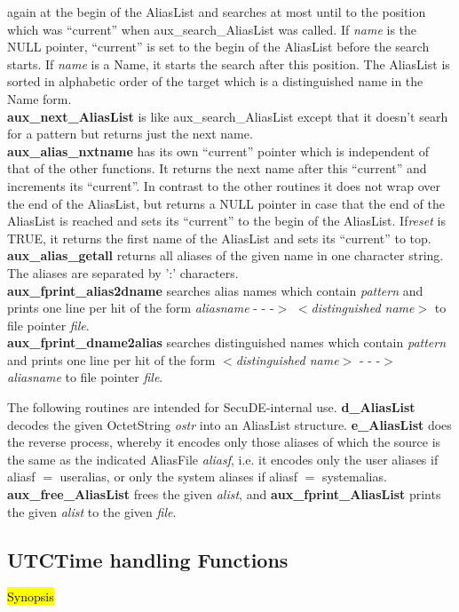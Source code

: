 again at the begin of the AliasList and searches at most until to the position
which was ``current'' when aux\_search\_AliasList was called. If {\em name} is the 
NULL pointer, ``current'' is set to the begin of the AliasList before the search starts.
If {\em name} is a Name, it starts the search after this position. The AliasList
is sorted in alphabetic order of the target which is a distinguished name in the Name form.
\\ [1em]
{\bf aux\_next\_AliasList} is like aux\_search\_AliasList except that it doesn't searh
for a pattern but returns just the next name. 
\\ [1em]
{\bf aux\_alias\_nxtname} has its own ``current'' pointer which is independent of that
of the other functions. It returns the next name after this ``current'' and increments
its ``current''. In contrast to the other routines it does not wrap over the end of
the AliasList, but returns a NULL pointer in case that the end of the AliasList
is reached and sets its ``current'' to the begin of the AliasList. If{\em reset} is TRUE,
it returns the first name of the AliasList and sets its ``current'' to top.
\\ [1em]
{\bf aux\_alias\_getall} returns all aliases of the given name in one character string.
The aliases are separated by ':' characters.
\\ [1em]
{\bf aux\_fprint\_alias2dname} searches alias names which contain {\em pattern} and
prints one line per hit of the form
\bc
{\em aliasname} - - -$>$ $<${\em distinguished name}$>$
\ec
to file pointer {\em file}.
\\ [1em]
{\bf aux\_fprint\_dname2alias} searches distinguished names which contain {\em pattern} and
prints one line per hit of the form
\bc
$<${\em distinguished name}$>$ - - -$>$  {\em aliasname}
\ec
to file pointer {\em file}.

The following routines are intended for SecuDE-internal use. {\bf d\_AliasList} decodes the
given OctetString {\em ostr} into an AliasList structure. {\bf e\_AliasList} does the reverse
process, whereby it encodes only those aliases of which the source is the same as the
indicated AliasFile {\em aliasf}, i.e. it encodes only the user aliases if aliasf $=$ useralias,
or only the system aliases if aliasf $=$ systemalias. {\bf aux\_free\_AliasList} frees
the given {\em alist}, and {\bf aux\_fprint\_AliasList} prints the given {\em alist}
to the given {\em file}.

\subsection{UTCTime handling Functions}
\label{aux_cpy}
\hl{Synopsis}

